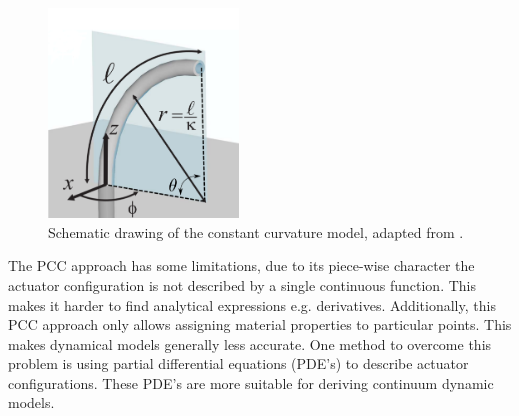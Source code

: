 \begin{figure}[H]
    \centering
    \includegraphics[width = 0.45\textwidth]{Figures/Chapter1/ccapproach2.png}
    \caption{Schematic drawing of the constant curvature model, adapted from \cite{ccapproach}.}
    \label{fig2:ccapproach}
\end{figure}

The PCC approach has some limitations, due to its piece-wise character the actuator configuration is not described by a single continuous function. This makes it harder to find analytical expressions e.g. derivatives. Additionally, this PCC approach only allows assigning material properties to particular points. This makes dynamical models generally less accurate. One method to overcome this problem is using partial differential equations (PDE's) to describe actuator configurations. These PDE's are more suitable for deriving continuum dynamic models. 

\newpage

